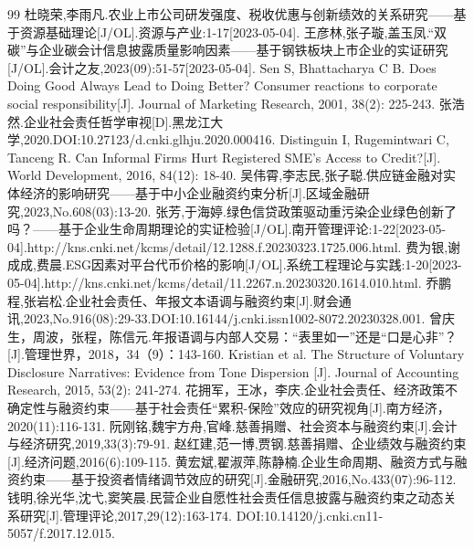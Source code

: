 \documentclass[12pt,a4paper]{article}
\newcommand{\sectiontitlefont}{\CJKfontspec{SimHei}[AutoFakeBold=4]\fontsize{14pt}{24pt}\selectfont}
\renewcommand{\refname}{\centering\sectiontitlefont 参考文献}
\begin{document}
\renewcommand{\refname}{\centering\sectiontitlefont 参考文献}
\begin{thebibliography}{99}
     杜晓荣,李雨凡.农业上市公司研发强度、税收优惠与创新绩效的关系研究——基于资源基础理论[J/OL].资源与产业:1-17[2023-05-04].
     王彦林,张子璇,盖玉凤.“双碳”与企业碳会计信息披露质量影响因素——基于钢铁板块上市企业的实证研究[J/OL].会计之友,2023(09):51-57[2023-05-04].
     Sen S, Bhattacharya C B. Does Doing Good Always Lead to Doing Better? Consumer reactions to corporate social responsibility[J]. Journal of Marketing Research, 2001, 38(2): 225-243.
     张浩然.企业社会责任哲学审视[D].黑龙江大学,2020.DOI:10.27123/d.cnki.glhju.2020.000416.
     Distinguin I, Rugemintwari C, Tanceng R. Can Informal Firms Hurt Registered SME's Access to Credit?[J]. World Development, 2016, 84(12): 18-40.
     吴伟霄,李志民,张子聪.供应链金融对实体经济的影响研究——基于中小企业融资约束分析[J].区域金融研究,2023,No.608(03):13-20.
     张芳,于海婷.绿色信贷政策驱动重污染企业绿色创新了吗？——基于企业生命周期理论的实证检验[J/OL].南开管理评论:1-22[2023-05-04].http://kns.cnki.net/kcms/detail/12.1288.f.20230323.1725.006.html.
     费为银,谢成成,费晨.ESG因素对平台代币价格的影响[J/OL].系统工程理论与实践:1-20[2023-05-04].http://kns.cnki.net/kcms/detail/11.2267.n.20230320.1614.010.html.
     乔鹏程,张岩松.企业社会责任、年报文本语调与融资约束[J].财会通讯,2023,No.916(08):29-33.DOI:10.16144/j.cnki.issn1002-8072.20230328.001.
     曾庆生，周波，张程，陈信元.年报语调与内部人交易：“表里如一”还是“口是心非”？[J].管理世界，2018，34（9）：143-160.
     Kristian et al. The Structure of Voluntary Disclosure Narratives: Evidence from Tone Dispersion [J]. Journal of Accounting Research, 2015, 53(2): 241-274.
     花拥军，王冰，李庆.企业社会责任、经济政策不确定性与融资约束——基于社会责任“累积-保险”效应的研究视角[J].南方经济，2020(11):116-131.
     阮刚铭,魏宇方舟,官峰.慈善捐赠、社会资本与融资约束[J].会计与经济研究,2019,33(3):79-91.
     赵红建,范一博,贾钢.慈善捐赠、企业绩效与融资约束[J].经济问题,2016(6):109-115.
     黄宏斌,翟淑萍,陈静楠.企业生命周期、融资方式与融资约束——基于投资者情绪调节效应的研究[J].金融研究,2016,No.433(07):96-112.
     钱明,徐光华,沈弋,窦笑晨.民营企业自愿性社会责任信息披露与融资约束之动态关系研究[J].管理评论,2017,29(12):163-174. DOI:10.14120/j.cnki.cn11-5057/f.2017.12.015.

\end{thebibliography}
\end{document}
